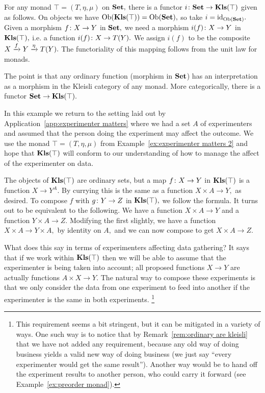 \documentclass[CT4S-EN-RU]{subfiles}
\begin{document}
\begin{exampleRUS}
\end{exampleRUS}

\begin{remarkENG}\label{rem:ordinary are kleisli}
For any monad $\top=(T,\eta,\mu)$ on ${\mathbf{Set}},$ there is a functor $i\colon {\mathbf{Set}}\rightarrow{\mathbf{Kls}}(\top)$ given as follows. On objects we have $\textnormal{Ob}({\mathbf{Kls}}(\top))=\textnormal{Ob}({\mathbf{Set}}),$ so take $i=\textnormal{id}_{\textnormal{Ob}({\mathbf{Set}})}.$ Given a morphism $f\colon X\rightarrow Y$ in ${\mathbf{Set}},$ we need a morphism $i(f)\colon X\rightarrow Y$ in ${\mathbf{Kls}}(\top),$ i.e. a function $i(f)\colon X\rightarrow T(Y).$ We assign $i(f)$ to be the composite $X\xrightarrow{f}Y\xrightarrow{\eta}T(Y).$ The functoriality of this mapping follows from the unit law for monads.

The point is that any ordinary function (morphism in ${\mathbf{Set}}$) has an interpretation as a morphism in the Kleisli category of any monad. More categorically, there is a functor ${\mathbf{Set}}\rightarrow{\mathbf{Kls}}(\top).$
\end{remarkENG}

\begin{remarkRUS}\label{rem:ordinary are kleisli}
\end{remarkRUS}

\begin{exampleENG}\label{ex:experimenter matters 3}
In this example we return to the setting laid out by Application~\ref{app:experimenter matters} where we had a set $A$ of experimenters and assumed that the person doing the experiment may affect the outcome. We use the monad $\top=(T,\eta,\mu)$ from Example~\ref{ex:experimenter matters 2} and hope that ${\mathbf{Kls}}(\top)$ will conform to our understanding of how to manage the affect of the experimenter on data.

The objects of ${\mathbf{Kls}}(\top)$ are ordinary sets, but a map $f\colon X\rightarrow Y$ in ${\mathbf{Kls}}(\top)$ is a function $X\to Y^A.$ By currying this is the same as a function $X\times A\to Y,$ as desired. To compose $f$ with $g\colon Y\rightarrow Z$ in ${\mathbf{Kls}}(\top),$ we follow the formula. It turns out to be equivalent to the following. We have a function $X\times A\to Y$ and a function $Y\times A\to Z.$ Modifying the first slightly, we have a function $X\times A\to Y\times A,$ by identity on $A,$ and we can now compose to get $X\times A\to Z.$

What does this say in terms of experimenters affecting data gathering? It says that if we work within ${\mathbf{Kls}}(\top)$ then we will be able to assume that the experimenter is being taken into account; all proposed functions $X\to Y$ are actually functions $A\times X\to Y.$ The natural way to compose these experiments is that we only consider the data from one experiment to feed into another if the experimenter is the same in both experiments.
\footnote{This requirement seems a bit stringent, but it can be mitigated in a variety of ways. One such way is to notice that by Remark~\ref{rem:ordinary are kleisli} that we have not added any requirement, because any old way of doing business yields a valid new way of doing business (we just say “every experimenter would get the same result”). Another way would be to hand off the experiment results to another person, who could carry it forward (see Example~\ref{ex:preorder monad}).}
\end{exampleENG}
\end{document}
